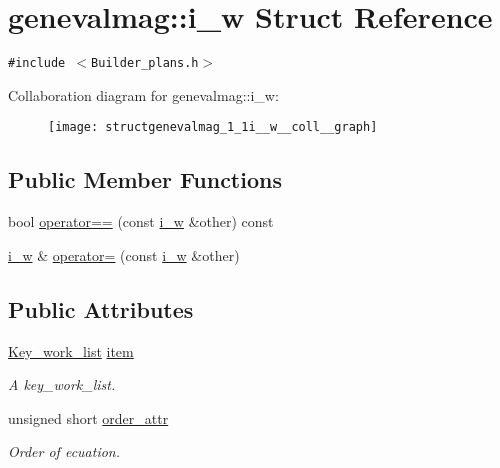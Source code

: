 \hypertarget{structgenevalmag_1_1i__w}{
\section{genevalmag::i\_\-w Struct Reference}
\label{structgenevalmag_1_1i__w}
}
{\tt \#include $<$Builder\_\-plans.h$>$}

Collaboration diagram for genevalmag::i\_\-w:\nopagebreak
\begin{figure}[H]
\begin{center}
\leavevmode
\texttt{[image: structgenevalmag\_1\_1i\_\_w\_\_coll\_\_graph]}
\end{center}
\end{figure}
\subsection*{Public Member Functions}
\begin{CompactItemize}
\item 
bool \hyperlink{structgenevalmag_1_1i__w_c382c0ff3ab5b4ae50512a64ec16ae5d}{operator==} (const \hyperlink{structgenevalmag_1_1i__w}{i\_\-w} \&other) const 
\item 
\hyperlink{structgenevalmag_1_1i__w}{i\_\-w} \& \hyperlink{structgenevalmag_1_1i__w_b769b7c451b0e1c4d2cb36eba15f99ab}{operator=} (const \hyperlink{structgenevalmag_1_1i__w}{i\_\-w} \&other)
\end{CompactItemize}
\subsection*{Public Attributes}
\begin{CompactItemize}
\item 
\hyperlink{structgenevalmag_1_1k__w}{Key\_\-work\_\-list} \hyperlink{structgenevalmag_1_1i__w_cb047851d2d48bfa097543a5a891e995}{item}
\begin{CompactList}\small\item\em A key\_\-work\_\-list. \item\end{CompactList}\item 
unsigned short \hyperlink{structgenevalmag_1_1i__w_a3b6c0dee2aa7ce5808ff3d7068e20e9}{order\_\-attr}
\begin{CompactList}\small\item\em Order of ecuation. \item\end{CompactList}\end{CompactItemize}


